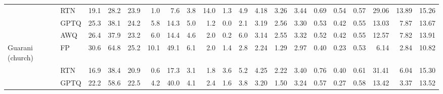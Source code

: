 \begin{landscape}
\begin{longtable}{llrrrrrrrrrrrrrrrrrr}
 & RTN & \cellcolor{loss!20}19.1 & \cellcolor{loss!24}28.2 & \cellcolor{loss!4}23.9 & \cellcolor{loss!15}1.0 & \cellcolor{loss!19}7.6 & \cellcolor{loss!4}3.8 & \cellcolor{loss!60}14.0 & \cellcolor{loss!5}1.3 & \cellcolor{loss!16}4.9 & \cellcolor{loss!36}4.18 & \cellcolor{loss!23}3.26 & \cellcolor{loss!7}3.44 & \cellcolor{loss!32}0.69 & \cellcolor{loss!21}0.54 & \cellcolor{loss!7}0.57 & \cellcolor{loss!39}29.06 & \cellcolor{loss!15}13.89 & \cellcolor{loss!6}15.26 \\
 & GPTQ & \cellcolor{loss!9}25.3 & \cellcolor{loss!6}38.1 & \cellcolor{loss!3}24.2 & \cellcolor{loss!7}5.8 & \cellcolor{loss!7}14.3 & \cellcolor{loss!2}5.0 & \cellcolor{loss!4}1.2 & 0.0 & \cellcolor{loss!3}2.1 & \cellcolor{loss!11}3.19 & \cellcolor{loss!6}2.56 & \cellcolor{loss!3}3.30 & \cellcolor{loss!11}0.53 & \cellcolor{loss!6}0.42 & \cellcolor{loss!3}0.55 & \cellcolor{loss!8}13.03 & \cellcolor{loss!3}7.87 & \cellcolor{loss!3}13.67 \\
 & AWQ & \cellcolor{loss!7}26.4 & \cellcolor{loss!7}37.9 & \cellcolor{loss!5}23.2 & \cellcolor{loss!7}6.0 & \cellcolor{loss!7}14.4 & \cellcolor{loss!3}4.6 & \cellcolor{loss!7}2.0 & \cellcolor{loss!1}0.2 & \cellcolor{loss!21}6.0 & \cellcolor{loss!10}3.14 & \cellcolor{loss!6}2.55 & \cellcolor{loss!4}3.32 & \cellcolor{loss!9}0.52 & \cellcolor{loss!5}0.42 & \cellcolor{loss!4}0.55 & \cellcolor{loss!7}12.57 & \cellcolor{loss!3}7.82 & \cellcolor{loss!3}13.91 \\
\midrule
Guarani (church) & FP & 30.6 & 64.8 & 25.2 & 10.1 & 49.1 & 6.1 & 2.0 & 1.4 & 2.8 & 2.24 & 1.29 & 2.97 & 0.40 & 0.23 & 0.53 & 6.14 & 2.84 & 10.82 \\
 & RTN & \cellcolor{loss!24}16.9 & \cellcolor{loss!46}38.4 & \cellcolor{loss!8}20.9 & \cellcolor{loss!16}0.6 & \cellcolor{loss!55}17.3 & \cellcolor{loss!5}3.1 & 1.8 & \cellcolor{loss!10}3.6 & \cellcolor{loss!10}5.2 & \cellcolor{loss!50}4.25 & \cellcolor{loss!23}2.22 & \cellcolor{loss!11}3.40 & \cellcolor{loss!48}0.76 & \cellcolor{loss!23}0.40 & \cellcolor{loss!11}0.61 & \cellcolor{loss!50}31.41 & \cellcolor{loss!6}6.04 & \cellcolor{loss!9}15.30 \\
 & GPTQ & \cellcolor{loss!15}22.2 & \cellcolor{loss!11}58.6 & \cellcolor{loss!5}22.5 & \cellcolor{loss!10}4.2 & \cellcolor{loss!16}40.0 & \cellcolor{loss!3}4.1 & \cellcolor{loss!2}2.4 & \cellcolor{loss!1}1.6 & \cellcolor{loss!5}3.8 & \cellcolor{loss!24}3.20 & \cellcolor{loss!5}1.50 & \cellcolor{loss!7}3.24 & \cellcolor{loss!23}0.57 & \cellcolor{loss!5}0.27 & \cellcolor{loss!7}0.58 & \cellcolor{loss!14}13.42 & \cellcolor{loss!1}3.37 & \cellcolor{loss!5}13.52 \\

\end{longtable}
\end{landscape}
